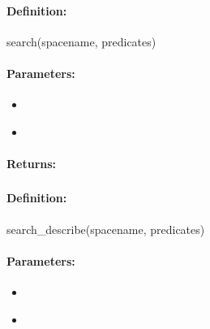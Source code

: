 \paragraph{Definition:}
\begin{rubycode}
search(spacename, predicates)
\end{rubycode}

\paragraph{Parameters:}
\begin{itemize}[noitemsep]
\item {}\\

\item {}\\

\end{itemize}

\paragraph{Returns:}


\pagebreak
\subsubsection{}
\label{api:ruby:search_describe}


\paragraph{Definition:}
\begin{rubycode}
search_describe(spacename, predicates)
\end{rubycode}

\paragraph{Parameters:}
\begin{itemize}[noitemsep]
\item {}\\

\item {}\\

\end{itemize}

